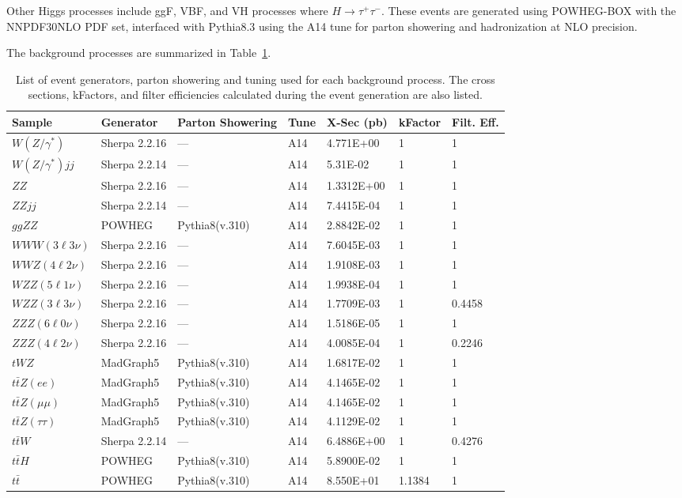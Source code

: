 Other Higgs processes include ggF, VBF, and VH processes where $H \rightarrow \tau^{+}\tau^{-}$. These events are generated using POWHEG-BOX with the NNPDF30NLO PDF set, interfaced with Pythia8.3 using the A14 tune for parton showering and hadronization at NLO precision.

The background processes are summarized in Table~\ref{tab:mc_background_samples}.

\begin{table}
  \centering
  \begin{tabular}{l|l|l|l|l|l|l}
    \hline
    Sample & Generator & Parton Showering & Tune & X-Sec (pb) & kFactor & Filt. Eff. \\
    \hline
    $W(Z/\gamma^{*})$ & Sherpa 2.2.16 & --- & A14 & 4.771E+00 & 1 & 1 \\
    $W(Z/\gamma^{*})jj$ & Sherpa 2.2.14 & --- & A14 & 5.31E-02 & 1 & 1 \\
    $ZZ$ & Sherpa 2.2.16 & --- & A14 & 1.3312E+00 & 1 & 1 \\
    $ZZjj$ & Sherpa 2.2.14 & --- & A14 & 7.4415E-04 & 1 & 1 \\
    $ggZZ$ & POWHEG & Pythia8(v.310) & A14 & 2.8842E-02 & 1 & 1 \\
    $WWW(3\ell 3\nu)$ & Sherpa 2.2.16 & --- & A14 & 7.6045E-03 & 1 & 1 \\
    $WWZ(4\ell 2\nu)$ & Sherpa 2.2.16 & --- & A14 & 1.9108E-03 & 1 & 1 \\
    $WZZ(5\ell 1\nu)$ & Sherpa 2.2.16 & --- & A14 & 1.9938E-04 & 1 & 1 \\
    $WZZ(3\ell 3\nu)$ & Sherpa 2.2.16 & --- & A14 & 1.7709E-03 & 1 & 0.4458 \\
    $ZZZ(6\ell 0\nu)$ & Sherpa 2.2.16 & --- & A14 & 1.5186E-05  & 1 & 1 \\
    $ZZZ(4\ell 2\nu)$ & Sherpa 2.2.16 & --- & A14 & 4.0085E-04  & 1 & 0.2246 \\
    $tWZ$ & MadGraph5 & Pythia8(v.310) & A14 & 1.6817E-02  & 1 & 1 \\
    $t\bar{t}Z(ee)$ & MadGraph5 & Pythia8(v.310) & A14 & 4.1465E-02  & 1 & 1 \\
    $t\bar{t}Z(\mu\mu)$ & MadGraph5 & Pythia8(v.310) & A14 & 4.1465E-02  & 1 & 1 \\
    $t\bar{t}Z(\tau\tau)$ & MadGraph5 & Pythia8(v.310) & A14 & 4.1129E-02  & 1 & 1 \\
    $t\bar{t}W$ & Sherpa 2.2.14 & --- & A14 & 6.4886E+00  & 1 & 0.4276 \\
    $t\bar{t}H$ & POWHEG & Pythia8(v.310) & A14 & 5.8900E-02  & 1 & 1 \\
    $t\bar{t}$ & POWHEG & Pythia8(v.310) & A14 & 8.550E+01  & 1.1384 & 1 \\
    \hline
  \end{tabular}
  \caption{List of event generators, parton showering and tuning used for each background process. The cross sections, kFactors, and filter efficiencies calculated during the event generation are also listed.}\label{tab:mc_background_samples}
\end{table}